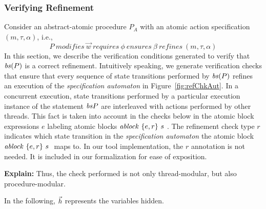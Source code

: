 \subsubsection{Verifying Refinement}
Consider an abstract-atomic procedure $P_{A}$ with an atomic action specification $(m, \tau, \alpha)$, i.e., $$P\ \mathit{modifies}\ \overrightarrow{w}\ \mathit{requires}\ \phi\ \mathit{ensures}\ \beta\ \mathit{refines}\ (m, \tau, \alpha)$$
In this section, we describe the verification conditions generated to verify that $\mathit{bs}(P)$ is a correct refinement. Intuitively speaking, we generate verification checks that ensure that every sequence of state transitions performed by $\mathit{bs}(P)$ refines an execution of the {\em specification automaton} in Figure~\ref{fig:refChkAut}. In a concurrent execution, state transitions performed by a particular execution instance of the statement $\mathit{bs}{P}$ are interleaved with actions performed by other threads. This fact is taken into account in the checks below in the atomic block expressions $e$ labeling atomic blocks $\mathit{ablock}\ {\{e,r\}}\ {s}\ $. The refinement check type $r$ indicates which state transition in the {\em specification automaton} the atomic block $\mathit{ablock}\ {\{e,r\}}\ {s}\ $ maps to. In our tool implementation, the $r$ annotation is not needed. It is included in our formalization for ease of exposition. 


{\bf Explain:} Thus, the check performed is not only thread-modular, but also procedure-modular. 

In the following, $\vec{h}$ represents the variables hidden.

